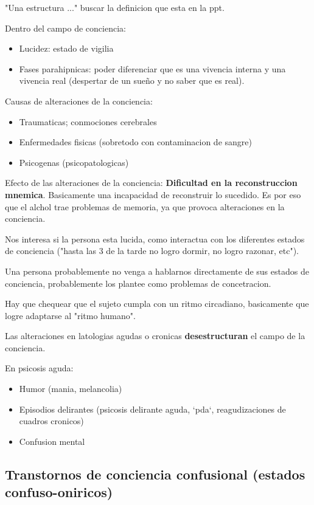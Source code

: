 \documentclass[12pt,a4paper]{article}
\begin{document}
"Una estructura ..." buscar la definicion que esta en la ppt. 

Dentro del campo de conciencia:

\begin{itemize}
	\item Lucidez: estado de vigilia
	\item Fases parahipnicas: poder diferenciar
  que es una vivencia interna y una vivencia real (despertar de un sueño
  y no saber que es real).
\end{itemize}

Causas de alteraciones de la conciencia:

\begin{itemize}
	\item Traumaticas; conmociones cerebrales
	\item Enfermedades fisicas (sobretodo con contaminacion de sangre)
	\item Psicogenas (psicopatologicas)
\end{itemize}

Efecto de las alteraciones de la conciencia: \textbf{Dificultad en la reconstruccion mnemica}. Basicamente una incapacidad de reconstruir lo
sucedido. Es por eso que el alchol trae problemas de memoria, ya que
provoca alteraciones en la conciencia. 

Nos interesa si la persona esta lucida, como interactua con los diferentes estados de conciencia ("hasta las 3 de la tarde no logro dormir, no logro razonar, etc"). 

Una persona probablemente no venga a hablarnos directamente de sus estados de conciencia, probablemente los plantee como problemas de concetracion. 

Hay que chequear que el sujeto cumpla con un ritmo circadiano, basicamente que logre adaptarse al "ritmo humano". 

Las alteraciones en latologias agudas o cronicas \textbf{desestructuran} el campo de la conciencia. 

En psicosis aguda:

\begin{itemize}
	\item Humor (mania, melancolia)
	\item Episodios delirantes (psicosis delirante aguda, `pda`, reagudizaciones de cuadros cronicos)
	\item Confusion mental
\end{itemize}

\subsection{Transtornos de conciencia confusional (estados confuso-oniricos)}%
\label{sec:transtornos_de_conciencia_confusional_estados_confuso_oniricos_}
\end{document}
